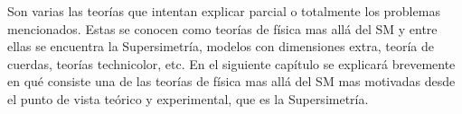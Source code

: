 
Son varias las teorías que intentan explicar parcial o totalmente los problemas
mencionados. Estas se conocen como teorías de física mas allá del SM y entre
ellas se encuentra la Supersimetría, modelos con dimensiones extra, teoría de
cuerdas, teorías technicolor, etc. En el siguiente capítulo se explicará brevemente
en qué consiste una de las teorías de física mas allá del SM mas motivadas desde
el punto de vista teórico y experimental, que es la Supersimetría.
